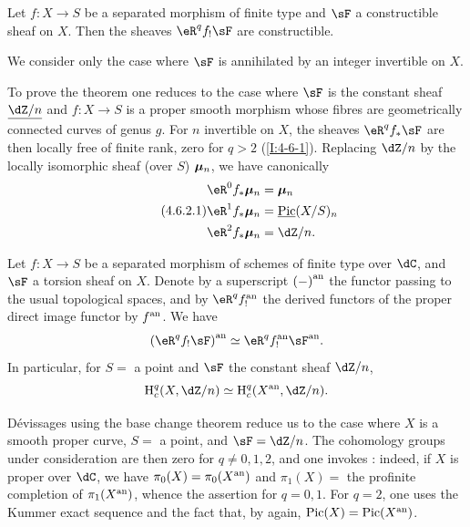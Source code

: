 \begin{theorem}[finiteness]\label{I:4-6-2}
Let $f:X\to S$ be a separated morphism of finite type and $\sF$ a
constructible sheaf on $X$. Then the sheaves $\eR^q f_! \sF$ are constructible.
\end{theorem}

We consider only the case where $\sF$ is annihilated by an integer invertible
on $X$.

To prove the theorem one reduces to the case where $\sF$ is the constant sheaf
$\const{\dZ/n}$ and $f:X\to S$ is a proper smooth morphism
whose fibres are geometrically connected curves of genus $g$.
For $n$ invertible on $X$, the sheaves $\eR^q f_* \sF$ are then locally
free of finite rank, zero for $q>2$ (\ref{I:4-6-1}). Replacing $\dZ/n$ by the
locally isomorphic sheaf (over $S$) ${\bm\mu}_n$, we have canonically 
\begin{equation*}\tag{4.6.2.1}\label{I:eq:4-6-2-1}
\begin{aligned}
  \eR^0 f_* \dmu_n &= \dmu_n \\
  \eR^1 f_* \dmu_n &= \const\pic(X/S)_n \\
  \eR^2 f_* \dmu_n &= \dZ/n \text{.}
\end{aligned}
\end{equation*}





\begin{theorem}\label{I:4-6-3}
Let $f:X\to S$ be a separated morphism of schemes of finite type over $\dC$,
and $\sF$ a torsion sheaf on $X$. Denote by a superscript ${(-)}^{\textnormal{an}}$ the
functor passing to the usual topological spaces, and by $\eR^q \an f_!$ the
derived functors of the proper direct image functor by ${f}^{\textnormal{an}}$. We have
\[
  \an{(\eR^q f_! \sF)} \simeq \eR^q \an f_! \an \sF \text{.}
\]
In particular, for $S=$ a point and $\sF$ the constant sheaf $\dZ/n$,
\[
  \h_c^q(X,\dZ/n) \simeq \h_c^q(\an X,\dZ/n)\text{.}
\]
\end{theorem}

D\'evissages using the base change theorem reduce us to the
case where $X$ is a smooth proper curve, $S=$ a point, and
$\sF=\dZ/n$. The cohomology groups under consideration are then zero for
$q\ne 0,1,2$, and one invokes \cite{se55}: indeed, if $X$ is proper over $\dC$,
we have $\pi_0(X) = \pi_0({X}^{\textnormal{an}})$ and $\pi_1(X) = $ the profinite completion of
$\pi_1({X}^{\textnormal{an}})$, whence the assertion for $q=0,1$. For $q=2$, one uses the
Kummer exact sequence and the fact that, by \cite{se55} again,
$\operatorname{Pic}(X)=\operatorname{Pic}({X}^{\textnormal{an}})$. 





